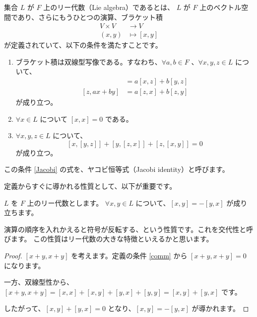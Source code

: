 \documentclass{ltjsarticle}
\begin{document}
\begin{definition}[リー代数]
    集合 $L$ が $F$ 上のリー代数（Lie algebra）であるとは、
    $L$ が $F$ 上のベクトル空間であり、さらにもうひとつの演算、ブラケット積
    \begin{align*}
        V \times V & \to V          \\
        (x, y)     & \mapsto [x, y]
    \end{align*}
    が定義されていて、以下の条件を満たすことです。
    \begin{enumerate}
        \item ブラケット積は双線型写像である。すなわち、$\forall a, b \in F$ 、$\forall x, y, z \in L$ について、
              \begin{align*}
                  [ax + by, z] & = a[x, z] + b[y, z] \\
                  [z, ax + by] & = a[z, x] + b[z, y]
              \end{align*}
              が成り立つ。
        \item\label{comm} $\forall x \in L$ について $[x, x] = 0$ である。
        \item\label{Jacobi} $\forall x, y, z \in L$ について、
              \[
                  [x, [y, z]] + [y, [z, x]] + [z, [x, y]] = 0
              \]
              が成り立つ。
    \end{enumerate}
\end{definition}

この条件 \ref{Jacobi} の式を、ヤコビ恒等式（Jacobi identity）と呼びます。

定義からすぐに導かれる性質として、以下が重要です。

\begin{proposition}[交代性]
    $L$ を $F$ 上のリー代数とします。
    $\forall x, y\in L$ について、$[x, y] = -[y, x]$ が成り立ちます。
\end{proposition}

演算の順序を入れかえると符号が反転する、という性質です。これを交代性と呼びます。
この性質はリー代数の大きな特徴といえるかと思います。

\begin{proof}
    $[x + y, x + y]$ を考えます。定義の条件 \ref{comm} から $[x + y, x + y] = 0$ になります。

    一方、双線型性から、$[x + y, x + y] = [x, x] + [x, y] + [y, x] + [y, y] = [x, y] + [y, x]$ です。

    したがって、$[x, y] + [y, x] = 0$ となり、$[x, y] = -[y, x]$ が導かれます。
\end{proof}
\end{document}
